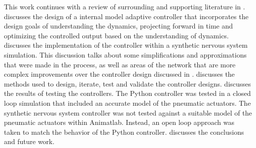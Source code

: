 This work continues with a review of surrounding and supporting literature in 
.  discusses the design of 
a internal model adaptive controller that incorporates the design goals of 
understanding the dynamics, projecting forward in time and optimizing the 
controlled output based on the understanding of dynamics.  discusses the implementation of the controller within a 
synthetic nervous system simulation. This discussion talks about some 
simplifications and approximations that were made in the process, as well as 
areas of the network that are more complex improvements over the controller 
design discussed in .  
discusses the methods used to design, iterate, test and validate the controller 
designs.  discusses the results of testing the controllers. The Python controller was tested in a closed loop simulation that included an accurate model of the pneumatic actuators. The synthetic nervous system controller was not tested against a suitable model of the pneumatic actuators within Animatlab. Instead, an open loop approach was taken to match the behavior of the Python controller. 
 discusses the conclusions and future work.
